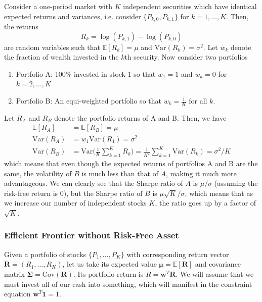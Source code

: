 \documentclass{article}
\begin{document}
    Consider a one-period market with $K$ independent securities which have identical expected returns and variances, i.e. consider $\{P_{k, 0}, P_{k, 1}\}$ for $k = 1, \ldots, K$. Then, the returns 
    \[R_k = \log(P_{k, 1}) - \log(P_{k, 0})\]
    are random variables such that $\mathbb{E}[R_k] = \mu$ and $\mathrm{Var}(R_k) = \sigma^2$. Let $w_k$ denote the fraction of wealth invested in the $k$th security. Now consider two portfolios 
    \begin{enumerate}
        \item Portfolio A: 100\% invested in stock 1 so that $w_1 = 1$ and $w_k  = 0$ for $k = 2, \ldots, K$ 
        \item Portfolio B: An equi-weighted portfolio so that $w_k = \frac{1}{K}$ for all $k$. 
    \end{enumerate}
    Let $R_A$ and $R_B$ denote the portfolio returns of A and B. Then, we have 
    \begin{align*}
        \mathbb{E}[R_A] & = \mathbb{E}[R_B] = \mu \\
        \mathrm{Var}(R_A) & = w_1 \mathrm{Var}(R_1) = \sigma^2 \\
        \mathrm{Var}(R_B) & = \mathrm{Var} \bigg( \frac{1}{K} \sum_{k=1}^K R_k \bigg) = \frac{1}{K^2} \sum_{k=1}^K \mathrm{Var}(R_k) = \sigma^2 / K
    \end{align*}
    which means that even though the expected returns of portfolios A and B are the same, the volatility of $B$ is much less than that of $A$, making it much more advantageous. We can clearly see that the Sharpe ratio of $A$ is $\mu / \sigma$ (assuming the risk-free return is $0$), but the Sharpe ratio of $B$ is $\mu \sqrt{K}/ \sigma$, which means that as we increase our number of independent stocks $K$, the ratio goes up by a factor of $\sqrt{K}$. 

    \subsubsection{Efficient Frontier without Risk-Free Asset}

      Given a portfolio of stocks $\{P_1, \ldots, P_K\}$ with corresponding return vector $\mathbf{R} = (R_1, \ldots, R_K)$, let us take its expected value $\boldsymbol{\mu} = \mathbb{E}[\mathbf{R}]$ and covariance matrix $\boldsymbol{\Sigma} = \mathrm{Cov}(\mathbf{R})$. Its portfolio return is $R = \mathbf{w}^T \mathbf{R}$. We will assume that we must invest all of our cash into something, which will manifest in the constraint equation $\mathbf{w}^T \mathbf{1} = 1$. 
\end{document}
